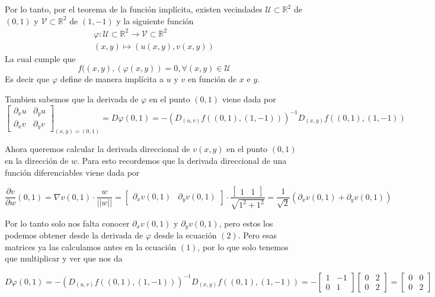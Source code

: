 \documentclass[a4paper,oneside,10.5pt]{article}
\newcommand\RR{\mathbb{R}}
\theoremstyle{definition}
\theoremstyle{plain}
\theoremstyle{remark}
\theoremstyle{theorem}
\begin{document}
Por lo tanto, por el teorema de la función implícita, existen vecindades $\mathcal{U} \subset \RR^2$ de $(0, 1)$ y $\mathcal{V} \subset \RR^2$ de $(1, -1)$ y la siguiente función
\begin{gather*}
    \varphi : \mathcal{U} \subset \RR^2 \to \mathcal{V} \subset \RR^2\\
    (x, y) \mapsto (u(x, y), v(x, y))
\end{gather*}
La cual cumple que
\begin{equation*}
f((x, y), (\varphi(x, y)) = 0, \forall (x, y) \in \mathcal{U}
\end{equation*}
Es decir que $\varphi$ define de manera implícita a $u$ y $v$ en función de $x$ e $y$.

Tambien sabemos que la derivada de $\varphi$ en el punto $(0, 1)$ viene dada por
\begin{equation}
\begin{bmatrix}
    \partial_x u & \partial_y u\\
    \partial_x v & \partial_y v
\end{bmatrix}_{(x, y) = (0, 1)}= D\varphi(0, 1) = -(D_{(u, v)}f((0, 1), (1, -1)))^{-1} D_{(x, y)}f((0, 1), (1, -1))
\end{equation}

Ahora queremos calcular la derivada direccional de $v(x, y)$ en el punto $(0, 1)$ en la dirección de $w$. Para esto recordemos que la derivada direccional de una función diferenciables viene dada por

\begin{equation}
    \frac{\partial v}{\partial w}(0, 1) = \nabla v(0, 1) \cdot \frac{w}{||w||} = \begin{bmatrix} \partial_x v(0, 1) & \partial_y v(0, 1) \end{bmatrix} \cdot \frac{\begin{bmatrix}
        1 & 1
    \end{bmatrix}}{\sqrt{1^2 + 1^2}} = \frac{1}{\sqrt2}(\partial_x v(0, 1) + \partial_y v(0, 1))
\end{equation}

Por lo tanto solo nos falta conocer $\partial_x v(0, 1)$ y $\partial_y v(0, 1)$, pero estos los podemos obtener desde la derivada de $\varphi$ desde la ecuación $(2)$. Pero esas matrices ya las calculamos antes en la ecuación $(1)$, por lo que solo tenemos que multiplicar y ver que nos da

\begin{equation*}
    D\varphi(0, 1) = -(D_{(u, v)}f((0, 1), (1, -1)))^{-1} D_{(x, y)}f((0, 1), (1, -1)) = - \begin{bmatrix}
        1 & -1\\ 0 & 1
    \end{bmatrix}\begin{bmatrix}
        0 & 2\\ 0 & 2
    \end{bmatrix} = \begin{bmatrix}
        0 & 0\\ 0 & 2
    \end{bmatrix}
\end{equation*}
\end{document}
